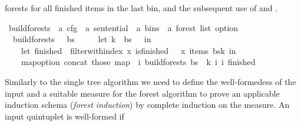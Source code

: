 \begin{isabellebody}
\begin{isamarkuptext}
forests for all finished items in the last bin, and the subsequent use of  and .%
\end{isamarkuptext}\isamarkuptrue%
\isamarkupfalse%
\ build{\isacharunderscore}{\kern0pt}forests\ {\isacharcolon}{\kern0pt}{\isacharcolon}{\kern0pt}\ {\isachardoublequoteopen}{\isacharprime}{\kern0pt}a\ cfg\ {\isasymRightarrow}\ {\isacharprime}{\kern0pt}a\ sentential\ {\isasymRightarrow}\ {\isacharprime}{\kern0pt}a\ bins\ {\isasymRightarrow}\ {\isacharprime}{\kern0pt}a\ forest\ list\ option{\isachardoublequoteclose}\ \isanewline
\ \ {\isachardoublequoteopen}build{\isacharunderscore}{\kern0pt}forests\ {\isasymG}\ {\isasymomega}\ bs\ {\isasymequiv}\isanewline
\ \ \ \ let\ k\ {\isacharequal}{\kern0pt}\ {\isacharbar}{\kern0pt}bs{\isacharbar}{\kern0pt}\ {\isacharminus}{\kern0pt}\ {}\ in\isanewline
\ \ \ \ let\ finished\ {\isacharequal}{\kern0pt}\ filter{\isacharunderscore}{\kern0pt}with{\isacharunderscore}{\kern0pt}index\ {\isacharparenleft}{\kern0pt}{\isasymlambda}x{\isachardot}{\kern0pt}\ is{\isacharunderscore}{\kern0pt}finished\ {\isasymG}\ {\isasymomega}\ x{\isacharparenright}{\kern0pt}\ {\isacharparenleft}{\kern0pt}items\ {\isacharparenleft}{\kern0pt}bs{\isacharbang}{\kern0pt}k{\isacharparenright}{\kern0pt}{\isacharparenright}{\kern0pt}\ in\isanewline
\ \ \ \ map{\isacharunderscore}{\kern0pt}option\ concat\ {\isacharparenleft}{\kern0pt}those\ {\isacharparenleft}{\kern0pt}map\ {\isacharparenleft}{\kern0pt}{\isasymlambda}{\isacharparenleft}{\kern0pt}{\isacharunderscore}{\kern0pt}{\isacharcomma}{\kern0pt}\ i{\isacharparenright}{\kern0pt}{\isachardot}{\kern0pt}\ build{\isacharunderscore}{\kern0pt}forests{\isacharprime}{\kern0pt}\ bs\ {\isasymomega}\ k\ i\ {\isacharbraceleft}{\kern0pt}i{\isacharbraceright}{\kern0pt}{\isacharparenright}{\kern0pt}\ finished{\isacharparenright}{\kern0pt}{\isacharparenright}{\kern0pt}{\isachardoublequoteclose}%
\isadelimdocument
%
\endisadelimdocument
%
\isatagdocument
%
\isamarkuptrue%
%
\endisatagdocument
{\isafolddocument}%
%
\isadelimdocument
%
\endisadelimdocument
%
\begin{isamarkuptext}%
Similarly to the single tree algorithm we need to define the well-formedess of the input and a suitable
measure for the forest algorithm to prove an applicable induction schema (\textit{forest induction}) by
complete induction on the measure. An input quintuplet  is well-formed if

\end{isamarkuptext}
\end{isabellebody}
